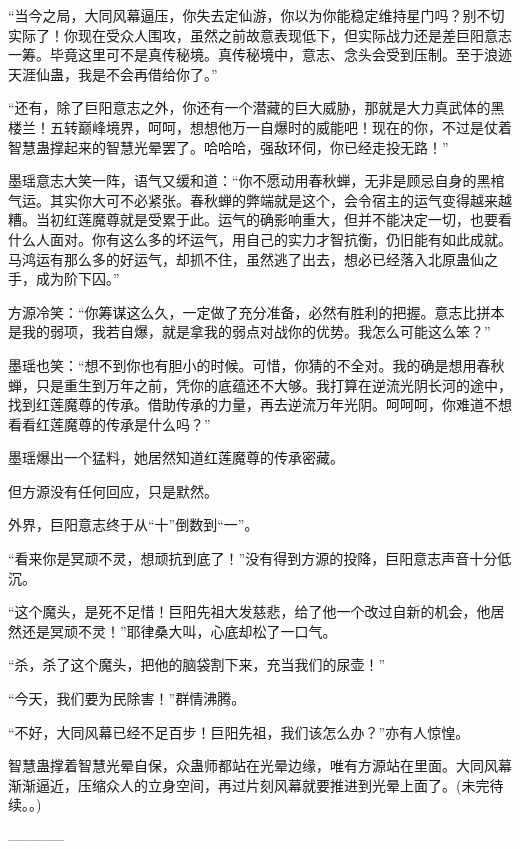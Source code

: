 \begin{this_body}
“当今之局，大同风幕逼压，你失去定仙游，你以为你能稳定维持星门吗？别不切实际了！你现在受众人围攻，虽然之前故意表现低下，但实际战力还是差巨阳意志一筹。毕竟这里可不是真传秘境。真传秘境中，意志、念头会受到压制。至于浪迹天涯仙蛊，我是不会再借给你了。”

“还有，除了巨阳意志之外，你还有一个潜藏的巨大威胁，那就是大力真武体的黑楼兰！五转巅峰境界，呵呵，想想他万一自爆时的威能吧！现在的你，不过是仗着智慧蛊撑起来的智慧光晕罢了。哈哈哈，强敌环伺，你已经走投无路！”

墨瑶意志大笑一阵，语气又缓和道：“你不愿动用春秋蝉，无非是顾忌自身的黑棺气运。其实你大可不必紧张。春秋蝉的弊端就是这个，会令宿主的运气变得越来越糟。当初红莲魔尊就是受累于此。运气的确影响重大，但并不能决定一切，也要看什么人面对。你有这么多的坏运气，用自己的实力才智抗衡，仍旧能有如此成就。马鸿运有那么多的好运气，却抓不住，虽然逃了出去，想必已经落入北原蛊仙之手，成为阶下囚。”

方源冷笑：“你筹谋这么久，一定做了充分准备，必然有胜利的把握。意志比拼本是我的弱项，我若自爆，就是拿我的弱点对战你的优势。我怎么可能这么笨？”

墨瑶也笑：“想不到你也有胆小的时候。可惜，你猜的不全对。我的确是想用春秋蝉，只是重生到万年之前，凭你的底蕴还不大够。我打算在逆流光阴长河的途中，找到红莲魔尊的传承。借助传承的力量，再去逆流万年光阴。呵呵呵，你难道不想看看红莲魔尊的传承是什么吗？”

墨瑶爆出一个猛料，她居然知道红莲魔尊的传承密藏。

但方源没有任何回应，只是默然。

外界，巨阳意志终于从“十”倒数到“一”。

“看来你是冥顽不灵，想顽抗到底了！”没有得到方源的投降，巨阳意志声音十分低沉。

“这个魔头，是死不足惜！巨阳先祖大发慈悲，给了他一个改过自新的机会，他居然还是冥顽不灵！”耶律桑大叫，心底却松了一口气。

“杀，杀了这个魔头，把他的脑袋割下来，充当我们的尿壶！”

“今天，我们要为民除害！”群情沸腾。

“不好，大同风幕已经不足百步！巨阳先祖，我们该怎么办？”亦有人惊惶。

智慧蛊撑着智慧光晕自保，众蛊师都站在光晕边缘，唯有方源站在里面。大同风幕渐渐逼近，压缩众人的立身空间，再过片刻风幕就要推进到光晕上面了。(未完待续。。)

------------

\end{this_body}

